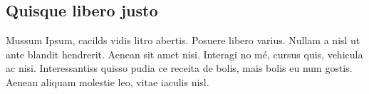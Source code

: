 \begin{apendicesenv}

\partapendices %

\chapter{Quisque libero justo}

Mussum Ipsum, cacilds vidis litro abertis. 
Posuere libero varius. 
Nullam a nisl ut ante blandit hendrerit. Aenean sit amet nisi. 
Interagi no mé, cursus quis, vehicula ac nisi. 
Interessantiss quisso pudia ce receita de bolis, mais bolis eu num gostis. 
Aenean aliquam molestie leo, vitae iaculis nisl. 

\end{apendicesenv}
